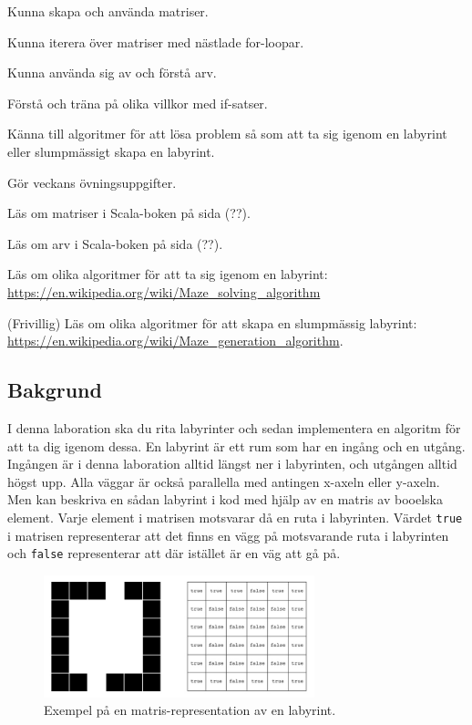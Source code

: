 
\Lab{\LabWeekNINE}

\begin{Goals}
\item Kunna skapa och använda matriser.
\item Kunna iterera över matriser med nästlade for-loopar.
\item Kunna använda sig av och förstå arv.
\item Förstå och träna på olika villkor med if-satser.
\item Känna till algoritmer för att lösa problem så som att ta sig igenom en labyrint eller slumpmässigt skapa en labyrint.
\end{Goals}

\begin{Preparations}
\item Gör veckans övningsuppgifter.
\item Läs om matriser i Scala-boken på sida (??).
\item Läs om arv i Scala-boken på sida (??).
\item Läs om olika algoritmer för att ta sig igenom en labyrint: \url{https://en.wikipedia.org/wiki/Maze\_solving\_algorithm}
\item (Frivillig) Läs om olika algoritmer för att skapa en slumpmässig labyrint: \url{https://en.wikipedia.org/wiki/Maze\_generation\_algorithm}.
\end{Preparations}

\subsection{Bakgrund}

I denna laboration ska du rita labyrinter och sedan implementera en algoritm för att ta dig igenom dessa. En labyrint är ett rum som har en ingång och en utgång. Ingången är i denna laboration alltid längst ner i labyrinten, och utgången alltid högst upp. Alla väggar är också parallella med antingen x-axeln eller y-axeln. Men kan beskriva en sådan labyrint i kod med hjälp av en matris av booelska element. Varje element i matrisen motsvarar då en ruta i labyrinten. Värdet \texttt{true} i matrisen representerar att det finns en vägg på motsvarande ruta i labyrinten och \texttt{false} representerar att där istället är en väg att gå på.

\begin{figure}[h]
	\begin{center}
		\includegraphics[width=0.7\textwidth]{../img/w09-lab/MazeAndMatrix.jpg}
	\end{center}
	\caption{Exempel på en matris-representation av en labyrint.}
\end{figure}

